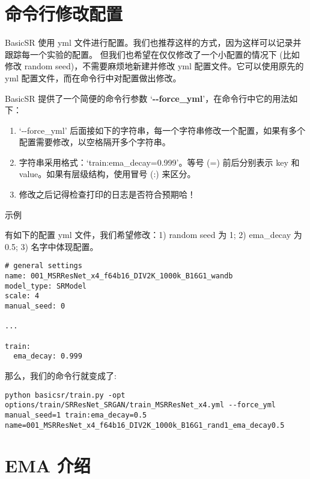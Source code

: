 \documentclass[../main.tex]{subfiles}
\begin{document}
\section{命令行修改配置}\label{others:yml_modification_with_commands}

BasicSR 使用 yml 文件进行配置。我们也推荐这样的方式，因为这样可以记录并跟踪每一个实验的配置。
但我们也希望在仅仅修改了一个小配置的情况下 (比如修改 random seed)，不需要麻烦地新建并修改 yml 配置文件。它可以使用原先的 yml 配置文件，而在命令行中对配置做出修改。

BasicSR 提供了一个简便的命令行参数 ‘\textbf{-{}-force\_yml}’，在命令行中它的用法如下：

\begin{enumerate}
    \item ‘-{}-force\_yml’ 后面接如下的字符串，每一个字符串修改一个配置，如果有多个配置需要修改，以空格隔开多个字符串。
    \item 字符串采用格式：‘train:ema\_decay=0.999’。等号 (=) 前后分别表示 key 和 value。如果有层级结构，使用冒号 (:) 来区分。
    \item 修改之后记得检查打印的日志是否符合预期哈！
\end{enumerate}

\begin{exampleBox}[]{示例}

    有如下的配置 yml 文件，我们希望修改：1) random seed 为 1; 2) ema\_decay 为0.5; 3) 名字中体现配置。

    \begin{verbatim}
# general settings
name: 001_MSRResNet_x4_f64b16_DIV2K_1000k_B16G1_wandb
model_type: SRModel
scale: 4
manual_seed: 0

...

train:
  ema_decay: 0.999
    \end{verbatim}

    那么，我们的命令行就变成了:
    \begin{verbatim}
python basicsr/train.py -opt options/train/SRResNet_SRGAN/train_MSRResNet_x4.yml --force_yml manual_seed=1 train:ema_decay=0.5 name=001_MSRResNet_x4_f64b16_DIV2K_1000k_B16G1_rand1_ema_decay0.5
    \end{verbatim}
\end{exampleBox}


\section{EMA 介绍}\label{others:ema}
\end{document}
